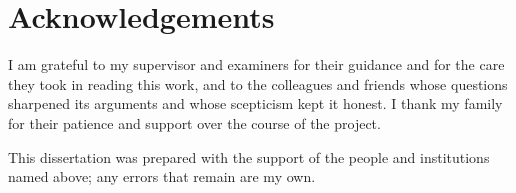 \chapter*{Acknowledgements}

I am grateful to my supervisor and examiners for their guidance and for the
care they took in reading this work, and to the colleagues and friends whose
questions sharpened its arguments and whose scepticism kept it honest. I thank
my family for their patience and support over the course of the project.

This dissertation was prepared with the support of the people and institutions
named above; any errors that remain are my own.
